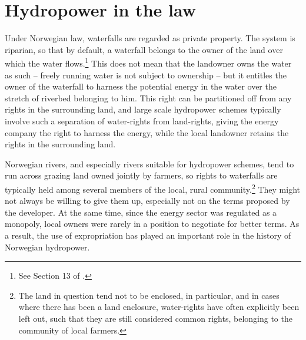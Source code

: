 \section{Hydropower in the law}\label{sec:hl}

Under Norwegian law, waterfalls are regarded as private property. The system is riparian, so that by default, a waterfall belongs to the owner of the land over which the water flows.\footnote{See Section 13 of \cite{wra00}.} This does not mean that the landowner owns the water as such -- freely running water is not subject to ownership -- but it entitles the owner of the waterfall to harness the potential energy in the water over the stretch of riverbed belonging to him. This right can be partitioned off from any rights in the surrounding land, and large scale hydropower schemes typically involve such a separation of water-rights from land-rights, giving the energy company the right to harness the energy, while the local landowner retains the rights in the surrounding land.

Norwegian rivers, and especially rivers suitable for hydropower schemes, tend to run across grazing land owned jointly by farmers, so rights to waterfalls are typically held among several members of the local, rural community.\footnote{The land in question tend not to be enclosed, in particular, and in cases where there has been a land enclosure, water-rights have often explicitly been left out, such that they are still considered common rights, belonging to the community of local farmers.} They might not always be willing to give them up, especially not on the terms proposed by the developer. At the same time, since the energy sector was regulated as a monopoly, local owners were rarely in a position to negotiate for better terms. As a result, the use of expropriation has played an important role in the history of Norwegian hydropower. 




